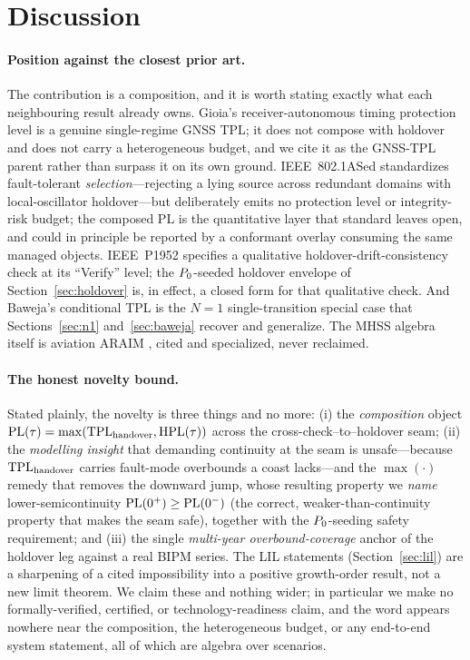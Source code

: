 \section{Discussion}
\label{sec:discussion}

\paragraph{Position against the closest prior art.}
The contribution is a composition, and it is worth stating exactly what each
neighbouring result already owns. Gioia's receiver-autonomous timing protection
level \citep{gioia2023} is a genuine single-regime GNSS TPL; it does not compose
with holdover and does not carry a heterogeneous budget, and we cite it as the
GNSS-TPL parent rather than surpass it on its own ground. IEEE~802.1ASed
\citep{ieee8021ased} standardizes fault-tolerant \emph{selection}---rejecting a
lying source across redundant domains with local-oscillator holdover---but
deliberately emits no protection level or integrity-risk budget; the composed PL
is the quantitative layer that standard leaves open, and could in principle be
reported by a conformant overlay consuming the same managed objects.
IEEE~P1952 \citep{ieeep1952} specifies a qualitative holdover-drift-consistency
check at its ``Verify'' level; the $P_0$-seeded holdover envelope of
Section~\ref{sec:holdover} is, in effect, a closed form for that qualitative
check. And Baweja's conditional TPL \citep{baweja2026tpl} is the $N=1$
single-transition special case that Sections~\ref{sec:n1} and~\ref{sec:baweja}
recover and generalize. The MHSS algebra itself is aviation ARAIM
\citep{blanch2015,joerger2014}, cited and specialized, never reclaimed.

\paragraph{The honest novelty bound.}
Stated plainly, the novelty is three things and no more: (i) the \emph{composition}
object $\mathrm{PL}(\tau)=\max(\mathrm{TPL}_{\mathrm{handover}},\mathrm{HPL}(\tau))$ across the
cross-check--to--holdover seam; (ii) the \emph{modelling insight} that demanding
continuity at the seam is unsafe---because $\mathrm{TPL}_{\mathrm{handover}}$ carries
fault-mode overbounds a coast lacks---and the $\max(\cdot)$ remedy that removes the
downward jump, whose resulting property we \emph{name} lower-semicontinuity
$\mathrm{PL}(0^{+})\ge\mathrm{PL}(0^{-})$ (the correct, weaker-than-continuity property that makes
the seam safe), together with the $P_0$-seeding safety requirement; and (iii)
the single \emph{multi-year overbound-coverage} anchor of the holdover leg against
a real BIPM series. The LIL statements (Section~\ref{sec:lil}) are a sharpening of
a cited impossibility into a positive growth-order result, not a new limit
theorem. We claim these and nothing wider; in particular we make no
formally-verified, certified, or technology-readiness claim, and the word
\Validated{} appears nowhere near the composition, the heterogeneous budget, or any
end-to-end system statement, all of which are \Proven{} algebra over \Modelled{}
scenarios.

